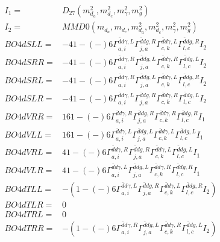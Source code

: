 \documentclass[A4,landscape]{article}
\begin{document}
\begin{align} 
I_1 = & D_{27}(m^2_{d_{{a}}}, m^2_{d_{{c}}}, m^2_{\gamma}, m^2_{g}) \\ 
I_2 = & MMD0(m_{d_{{a}}}, m_{d_{{c}}}, m^2_{d_{{a}}}, m^2_{d_{{c}}}, m^2_{\gamma}, m^2_{g}) \\ 
  BO4dSLL= & -4   1
-(-)
  6 \Gamma^{\bar{d}d \gamma ,L}_{a, i} \Gamma^{\bar{d}d g ,R}_{j, a} \Gamma^{\bar{d}d \gamma ,L}_{c, k} \Gamma^{\bar{d}d g ,R}_{l, c} I_2 \\ 
  BO4dSRR= & -4   1
-(-)
  6 \Gamma^{\bar{d}d \gamma ,R}_{a, i} \Gamma^{\bar{d}d g ,L}_{j, a} \Gamma^{\bar{d}d \gamma ,R}_{c, k} \Gamma^{\bar{d}d g ,L}_{l, c} I_2 \\ 
  BO4dSRL= & -4   1
-(-)
  6 \Gamma^{\bar{d}d \gamma ,R}_{a, i} \Gamma^{\bar{d}d g ,L}_{j, a} \Gamma^{\bar{d}d \gamma ,L}_{c, k} \Gamma^{\bar{d}d g ,R}_{l, c} I_2 \\ 
  BO4dSLR= & -4   1
-(-)
  6 \Gamma^{\bar{d}d \gamma ,L}_{a, i} \Gamma^{\bar{d}d g ,R}_{j, a} \Gamma^{\bar{d}d \gamma ,R}_{c, k} \Gamma^{\bar{d}d g ,L}_{l, c} I_2 \\ 
  BO4dVRR= & 16   1
-(-)
  6 \Gamma^{\bar{d}d \gamma ,R}_{a, i} \Gamma^{\bar{d}d g ,R}_{j, a} \Gamma^{\bar{d}d \gamma ,R}_{c, k} \Gamma^{\bar{d}d g ,R}_{l, c} I_1 \\ 
  BO4dVLL= & 16   1
-(-)
  6 \Gamma^{\bar{d}d \gamma ,L}_{a, i} \Gamma^{\bar{d}d g ,L}_{j, a} \Gamma^{\bar{d}d \gamma ,L}_{c, k} \Gamma^{\bar{d}d g ,L}_{l, c} I_1 \\ 
  BO4dVRL= & 4   1
-(-)
  6 \Gamma^{\bar{d}d \gamma ,R}_{a, i} \Gamma^{\bar{d}d g ,R}_{j, a} \Gamma^{\bar{d}d \gamma ,L}_{c, k} \Gamma^{\bar{d}d g ,L}_{l, c} I_1 \\ 
  BO4dVLR= & 4   1
-(-)
  6 \Gamma^{\bar{d}d \gamma ,L}_{a, i} \Gamma^{\bar{d}d g ,L}_{j, a} \Gamma^{\bar{d}d \gamma ,R}_{c, k} \Gamma^{\bar{d}d g ,R}_{l, c} I_1 \\ 
  BO4dTLL= & -(  1
-(-)
  6 \Gamma^{\bar{d}d \gamma ,L}_{a, i} \Gamma^{\bar{d}d g ,R}_{j, a} \Gamma^{\bar{d}d \gamma ,L}_{c, k} \Gamma^{\bar{d}d g ,R}_{l, c} I_2) \\ 
  BO4dTLR= & 0 \\ 
  BO4dTRL= & 0 \\ 
  BO4dTRR= & -(  1
-(-)
  6 \Gamma^{\bar{d}d \gamma ,R}_{a, i} \Gamma^{\bar{d}d g ,L}_{j, a} \Gamma^{\bar{d}d \gamma ,R}_{c, k} \Gamma^{\bar{d}d g ,L}_{l, c} I_2) \\ 
\end{align} 
\end{document}
